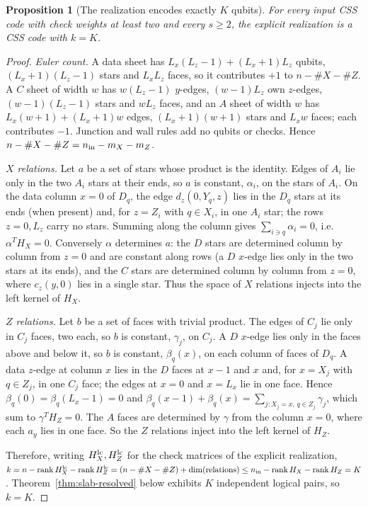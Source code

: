 \documentclass[aps,prx,reprint,superscriptaddress,nofootinbib,floatfix,longbibliography]{revtex4-2}
\newtheorem{proposition}[theorem]{Proposition}
\theoremstyle{definition}
\DeclareMathOperator{\rank}{rank}
\begin{document}
\begin{proposition}[The realization encodes exactly $K$ qubits]
\label{prop:explicit-k}
For every input CSS code with check weights at least two and every
$s\ge2$, the explicit realization is a CSS code with $k=K$.
\end{proposition}
\begin{proof}
\emph{Euler count.}  A data sheet has $L_x(L_z-1)+(L_x+1)L_z$ qubits,
$(L_x+1)(L_z-1)$ stars and $L_xL_z$ faces, so it contributes $+1$ to
$n-\#X-\#Z$.  A $C$ sheet of width $w$ has $w(L_z-1)$ $y$-edges,
$(w-1)L_z$ own $z$-edges, $(w-1)(L_z-1)$ stars and $wL_z$ faces, and an $A$
sheet of width $w$ has $L_x(w+1)+(L_x+1)w$ edges, $(L_x+1)(w+1)$ stars and
$L_xw$ faces; each contributes $-1$.  Junction and wall rules add no qubits
or checks.  Hence $n-\#X-\#Z=n_{\rm in}-m_X-m_Z$.

\emph{$X$ relations.}  Let $a$ be a set of stars whose product is the
identity.  Edges of $A_i$ lie only in the two $A_i$ stars at their ends, so
$a$ is constant, $\alpha_i$, on the stars of $A_i$.  On the data column
$x=0$ of $D_q$, the edge $d_z(0,Y_q,z)$ lies in the $D_q$ stars at its ends
(when present) and, for $z=Z_i$ with $q\in X_i$, in one $A_i$ star; the rows
$z=0,L_z$ carry no stars.  Summing along the column gives
$\sum_{i\ni q}\alpha_i=0$, i.e.\ $\alpha^TH_X=0$.  Conversely $\alpha$
determines $a$: the $D$ stars are determined column by column from $z=0$ and
are constant along rows (a $D$ $x$-edge lies only in the two stars at its
ends), and the $C$ stars are determined column by column from $z=0$, where
$c_z(y,0)$ lies in a single star.  Thus the space of $X$ relations injects
into the left kernel of $H_X$.

\emph{$Z$ relations.}  Let $b$ be a set of faces with trivial product.  The
edges of $C_j$ lie only in $C_j$ faces, two each, so $b$ is constant,
$\gamma_j$, on $C_j$.  A $D$ $x$-edge lies only in the faces above and below
it, so $b$ is constant, $\beta_q(x)$, on each column of faces of $D_q$.  A
data $z$-edge at column $x$ lies in the $D$ faces at $x-1$ and $x$ and, for
$x=X_j$ with $q\in Z_j$, in one $C_j$ face; the edges at $x=0$ and $x=L_x$ lie
in one face.  Hence $\beta_q(0)=\beta_q(L_x-1)=0$ and
$\beta_q(x-1)+\beta_q(x)=\sum_{j:X_j=x,\,q\in Z_j}\gamma_j$, which sum to
$\gamma^TH_Z=0$.  The $A$ faces are determined by $\gamma$ from the column
$x=0$, where each $a_y$ lies in one face.  So the $Z$ relations inject into the
left kernel of $H_Z$.

Therefore, writing $H_X^{\rm lc},H_Z^{\rm lc}$ for the check matrices of the explicit realization, $k=n-\rank H_X^{\rm lc}-\rank H_Z^{\rm lc}
=(n-\#X-\#Z)+\dim(\text{relations})\le
n_{\rm in}-\rank H_X-\rank H_Z=K$.  Theorem~\ref{thm:slab-resolved} below
exhibits $K$ independent logical pairs, so $k=K$.
\end{proof}
\end{document}
